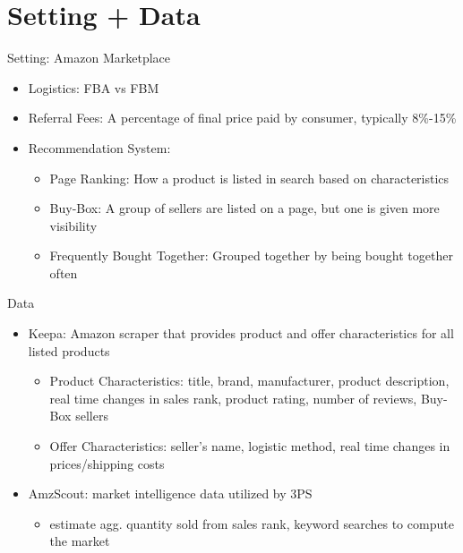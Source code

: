 \documentclass[aspectratio=169,professionalfonts]{beamer}
\begin{document}
\section{Setting + Data}

\begin{frame}{Setting: Amazon Marketplace}
  \begin{itemize}
    \item Logistics: FBA vs FBM
    \item Referral Fees: A percentage of final price paid by consumer, typically 8\%-15\%
    \item Recommendation System:
    \begin{itemize}
      \item Page Ranking: How a product is listed in search based on characteristics
      \item Buy-Box: A group of sellers are listed on a page, but one is given more visibility
      \item Frequently Bought Together: Grouped together by being bought together often
    \end{itemize}
  \end{itemize}
\end{frame}

\begin{frame}{Data}
  \begin{itemize}
    \item Keepa: Amazon scraper that provides product and offer characteristics for all listed products
    \begin{itemize}
      \item Product Characteristics: title, brand, manufacturer, product description, real time changes in sales rank, product rating, number of reviews, Buy-Box sellers
      \item Offer Characteristics: seller's name, logistic method, real time changes in prices/shipping costs
    \end{itemize}
    \item AmzScout: market intelligence data utilized by 3PS
    \begin{itemize}
      \item estimate agg. quantity sold from sales rank, keyword searches to compute the market
    \end{itemize}
  \end{itemize}
\end{frame}
\end{document}

